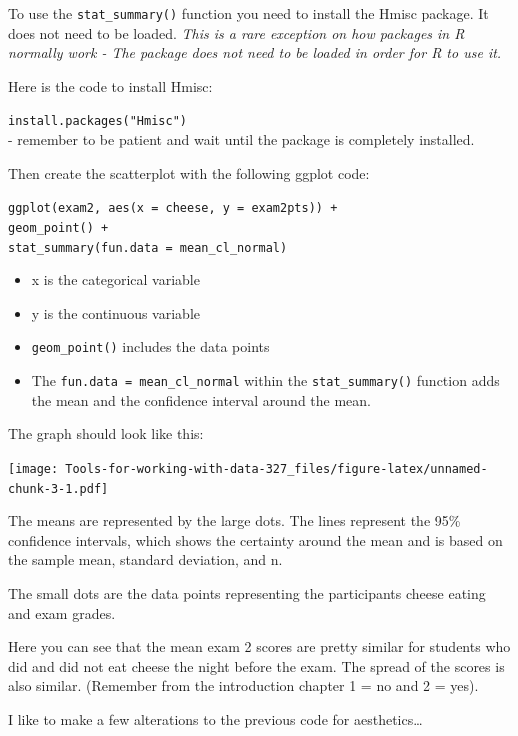 \documentclass[
]{book}
\providecommand{\tightlist}{%
  \setlength{\itemsep}{0pt}\setlength{\parskip}{0pt}}
\begin{document}
To use the \texttt{stat\_summary()} function you need to install the Hmisc package. It does not need to be loaded. \emph{This is a rare exception on how packages in R normally work - The package does not need to be loaded in order for R to use it.}

Here is the code to install Hmisc:

\texttt{install.packages("Hmisc")}\\
- remember to be patient and wait until the package is completely installed.

Then create the scatterplot with the following ggplot code:

\texttt{ggplot(exam2,\ aes(x\ =\ cheese,\ y\ =\ exam2pts))\ +}\\
\texttt{geom\_point()\ +}~\\
\texttt{stat\_summary(fun.data\ =\ mean\_cl\_normal)}

\begin{itemize}
\tightlist
\item
  x is the categorical variable\\
\item
  y is the continuous variable\\
\item
  \texttt{geom\_point()} includes the data points\\
\item
  The \texttt{fun.data\ =\ mean\_cl\_normal} within the \texttt{stat\_summary()} function adds the mean and the confidence interval around the mean.
\end{itemize}

The graph should look like this:

\texttt{[image: Tools-for-working-with-data-327\_files/figure-latex/unnamed-chunk-3-1.pdf]}

The means are represented by the large dots. The lines represent the 95\% confidence intervals, which shows the certainty around the mean and is based on the sample mean, standard deviation, and n.~

The small dots are the data points representing the participants cheese eating and exam grades.

Here you can see that the mean exam 2 scores are pretty similar for students who did and did not eat cheese the night before the exam. The spread of the scores is also similar. (Remember from the introduction chapter 1 = no and 2 = yes).

I like to make a few alterations to the previous code for aesthetics\ldots{}
\end{document}
